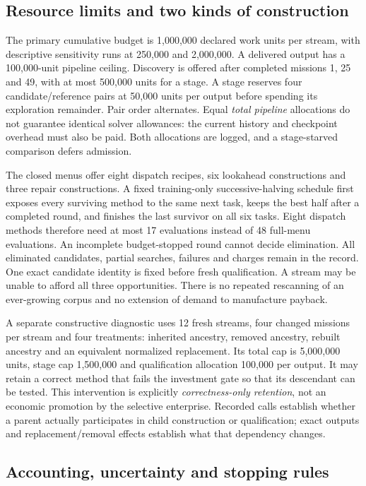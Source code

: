 \subsection{Resource limits and two kinds of construction}

The primary cumulative budget is 1,000,000 declared work units per stream, with descriptive sensitivity runs at 250,000 and 2,000,000. A delivered output has a 100,000-unit pipeline ceiling. Discovery is offered after completed missions 1, 25 and 49, with at most 500,000 units for a stage. A stage reserves four candidate/reference pairs at 50,000 units per output before spending its exploration remainder. Pair order alternates. Equal \emph{total pipeline} allocations do not guarantee identical solver allowances: the current history and checkpoint overhead must also be paid. Both allocations are logged, and a stage-starved comparison defers admission.

The closed menus offer eight dispatch recipes, six lookahead constructions and three repair constructions. A fixed training-only successive-halving schedule first exposes every surviving method to the same next task, keeps the best half after a completed round, and finishes the last survivor on all six tasks. Eight dispatch methods therefore need at most 17 evaluations instead of 48 full-menu evaluations. An incomplete budget-stopped round cannot decide elimination. All eliminated candidates, partial searches, failures and charges remain in the record. One exact candidate identity is fixed before fresh qualification. A stream may be unable to afford all three opportunities. There is no repeated rescanning of an ever-growing corpus and no extension of demand to manufacture payback.

A separate constructive diagnostic uses 12 fresh streams, four changed missions per stream and four treatments: inherited ancestry, removed ancestry, rebuilt ancestry and an equivalent normalized replacement. Its total cap is 5,000,000 units, stage cap 1,500,000 and qualification allocation 100,000 per output. It may retain a correct method that fails the investment gate so that its descendant can be tested. This intervention is explicitly \emph{correctness-only retention}, not an economic promotion by the selective enterprise. Recorded calls establish whether a parent actually participates in child construction or qualification; exact outputs and replacement/removal effects establish what that dependency changes.

\subsection{Accounting, uncertainty and stopping rules}

